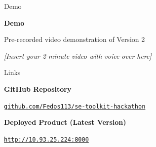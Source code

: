 \documentclass[aspectratio=169]{beamer}
\begin{document}
\begin{frame}{Demo}
    \begin{center}
        \vspace{1cm}
        {\Huge \textbf{Demo}}

        \vspace{0.5cm}
        {\Large Pre-recorded video demonstration of Version 2}

        \vspace{1cm}
        \textit{[Insert your 2-minute video with voice-over here]}
    \end{center}
\end{frame}

\begin{frame}{Links}
    \begin{center}
        \begin{minipage}[t]{0.45\textwidth}
            \centering
            \textbf{GitHub Repository}

            \vspace{0.2cm}
            \href{https://github.com/Fedos113/se-toolkit-hackathon}{\texttt{github.com/Fedos113/se-toolkit-hackathon}}

            \vspace{0.3cm}
        \end{minipage}
        \hfill
        \begin{minipage}[t]{0.45\textwidth}
            \centering
            \textbf{Deployed Product (Latest Version)}

            \vspace{0.2cm}
            \href{http://10.93.25.224:8000}{\texttt{http://10.93.25.224:8000}}

            \vspace{0.3cm}
        \end{minipage}
    \end{center}
\end{frame}
\end{document}
